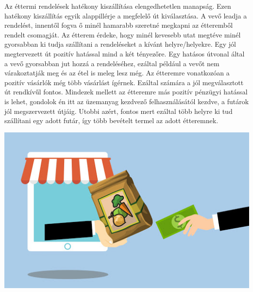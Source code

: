 
Az éttermi rendelések hatékony kiszállítása elengedhetetlen manapság. Ezen hatékony kiszállítás egyik alappillérje a megfelelő út kiválasztása. A vevő leadja a rendelést, innentől fogva ő minél hamarabb szeretné megkapni az étteremből rendelt csomagját. Az étterem érdeke, hogy minél kevesebb utat megtéve minél gyorsabban ki tudja szállítani a rendeléseket a kívánt helyre/helyekre. Egy jól megtervezett út pozitív hatással mind a két tényezőre. Egy hatásos útvonal által a vevő gyorsabban jut hozzá a rendeléséhez, ezáltal például a vevőt nem várakoztatják meg és az étel is meleg lesz még. Az étteremre vonatkozóan a pozitív vásárlók még több vásárlást ígérnek. Ezáltal számára a jól megválasztott út rendkívűl fontos. Mindezek mellett az étteremre más pozitív pénzügyi hatással is lehet, gondolok én itt az üzemanyag kezdvező felhasználásától kezdve, a futárok jól megszervezett útjáig. Utobbi azért, fontos mert ezáltal több helyre ki tud szállítani egy adott futár, így több bevételt termel az adott étteremnek.

\includegraphics[scale=0.6]{images/delivery.jpg}
